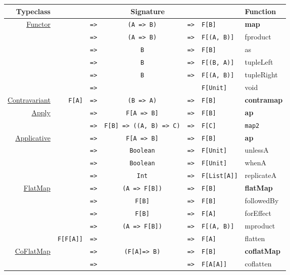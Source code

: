 \documentclass{tufte-handout}
\newcommand{\fa}{F[A]}
\newcommand{\fb}{F[B]}
\newcommand{\rarr}{\texttt{=>}}
\newcommand{\fTwo}[2]{\texttt{#1} & \rarr & & & \texttt{#2}}
\newcommand{\fThree}[3]{\texttt{#1} & \rarr & \texttt{#2} & \rarr & \texttt{#3}}
\newcommand{\sdocUrl}[1]{https://typelevel.org/cats/api/cats/#1.html}
\newcommand{\sdocHref}[1]{\href{\sdocUrl{#1}}{#1}}
\begin{document}
\begin{table}[ht]
  \centering
  \selectfont
  \begin{tabular}{rrcclll}
    Typeclass & \multicolumn{5}{c}{Signature} & Function \\

    \midrule

    \multirow{6}{*}{\sdocHref{Functor}}
      & \fThree{\multirow{6}{*}{\fa}}{(A => B)}{\fb} & \textbf{map} \\
      & \fThree{}{(A => B)}{F[(A, B)]} & fproduct \\
      & \fThree{}{B}{\fb} & as \\
      & \fThree{}{B}{F[(B, A)]} & tupleLeft \\
      & \fThree{}{B}{F[(A, B)]} & tupleRight \\
      & \fTwo{}{F[Unit]} & void \\[.5cm]

    \multirow{1}{*}{\sdocHref{Contravariant}}
      & \fThree{\fa}{(B => A)}{\fb} & \textbf{contramap} \\[.5cm]

    \multirow{2}{*}{\sdocHref{Apply}\footnotemark}
      & \fThree{\multirow{2}{*}{\fa}}{F[A => B]}{\fb} & \textbf{ap} \\
      & \fThree{}{F[B] => ((A, B) => C)}{F[C]} & \texttt{map2} \\[.5cm]

    \multirow{4}{*}{\sdocHref{Applicative}}
      & \fThree{\multirow{4}{*}{\fa}}{F[A => B]}{\fb} & \textbf{ap} \\
      & \fThree{}{Boolean}{F[Unit]} & unlessA \\
      & \fThree{}{Boolean}{F[Unit]} & whenA \\
      & \fThree{}{Int}{F[List[A]]} & replicateA \\[.5cm]

    \multirow{5}{*}{\sdocHref{FlatMap}}
      & \fThree{\multirow{4}{*}{\fa}}{(A => F[B])}{\fb} & \textbf{flatMap} \\
      & \fThree{}{\fb}{\fb} & followedBy \\
      & \fThree{}{\fb}{\fa} & forEffect \\
      & \fThree{}{(A => \fb)}{F[(A, B)]} & mproduct \\
      & \fThree{F[F[A]]}{}{\fa} & flatten \\[.5cm]

    \multirow{2}{*}{\sdocHref{CoFlatMap}}
      & \fThree{\multirow{2}{*}{\fa}}{(\fa => B)}{\fb} & \textbf{coflatMap} \\
      & \fThree{}{}{F[A[A]]} & coflatten \\[.5cm]

  \end{tabular}
\end{table}
\end{document}
